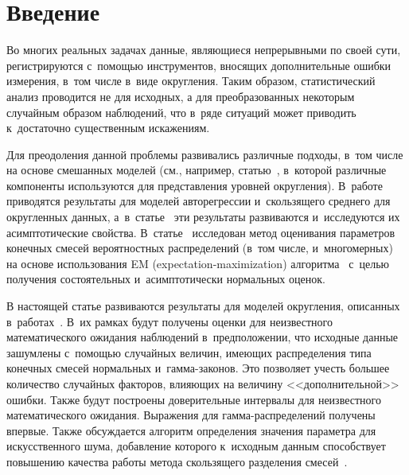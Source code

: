 
\thispagestyle{headings}

\begin{multicols}{2}

\label{st\stat}


\section{Введение}

Во многих реальных задачах данные, являющиеся непрерывными по своей сути, 
регистрируются с~помощью инструментов, вносящих дополнительные ошибки 
измерения, в~том чис\-ле в~виде округления. Таким образом, статистический 
анализ проводится не для исходных, а для преобразованных некоторым 
случайным образом наблюдений, что в~ряде ситуаций может приводить к~достаточно
 существенным искажениям.

Для преодоления данной проблемы развивались различные подходы, в~том числе 
на основе смешанных моделей (см., например, статью~\cite{Wright2003}, в~которой 
различные компоненты  используются для пред\-став\-ле\-ния уровней округления). 
В~работе~\cite{Bai2009} приводятся результаты для моделей авторегрессии и~скользящего 
среднего для округленных данных, а~в~статье~\cite{Zhang2010} эти результаты 
развиваются и~исследуются их асимптотические свойства. 
В~статье~\cite{Zhao2012} исследован метод оценивания па\-ра\-мет\-ров конечных смесей 
вероятностных распределений (в~том чис\-ле, и~многомерных) 
на основе использования EM (expectation-maximization) 
алгоритма~\cite{Korolev2011-i} с~\mbox{целью} получения состоятельных 
и~асимптотически нормальных оценок.

В настоящей статье развиваются результаты для моделей округления, 
описанных в~работах~\cite{Ushakov2015,Ushakov2017a,Ushakov2017b}. 
В~их рамках будут получены оценки для неизве\-ст\-ного математического ожидания 
наблюдений в~предположении, что исходные данные зашумлены с~по\-мощью случайных 
величин, имеющих распределения типа конечных смесей нормальных и~гам\-ма-за\-ко\-нов. 
Это позволяет учесть большее количество случайных факторов, влия\-ющих на величину 
<<дополнительной>> ошибки. Также будут построены доверительные интервалы для 
неизвестного математического ожидания. Выражения для гам\-ма-рас\-пре\-де\-ле\-ний 
получены впервые. Также обсуждается алгоритм определения значения па\-ра\-мет\-ра для 
искусственного шума, добавление которого к~исходным данным способствует 
повышению качества работы метода скользящего разделения смесей~\cite{Gorshenin2016}.


\end{multicols}
